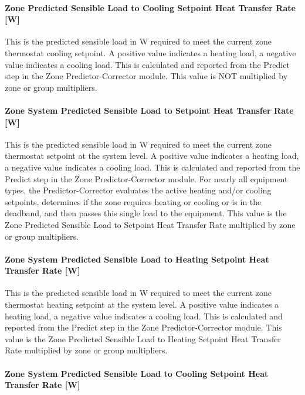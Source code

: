 \paragraph{Zone Predicted Sensible Load to Cooling Setpoint Heat Transfer Rate {[}W{]}}

This is the predicted sensible load in W required to meet the current zone thermostat cooling setpoint. A positive value indicates a heating load, a negative value indicates a cooling load. This is calculated and reported from the Predict step in the Zone Predictor-Corrector module. This value is NOT multiplied by zone or group multipliers.

\paragraph{Zone System Predicted Sensible Load to Setpoint Heat Transfer Rate {[}W{]}}\label{zone-predicted-sensible-load-to-setpoint-heat-transfer-rate-w}

This is the predicted sensible load in W required to meet the current zone thermostat setpoint at the system level. A positive value indicates a heating load, a negative value indicates a cooling load. This is calculated and reported from the Predict step in the Zone Predictor-Corrector module. For nearly all equipment types, the Predictor-Corrector evaluates the active heating and/or cooling setpoints, determines if the zone requires heating or cooling or is in the deadband, and then passes this single load to the equipment. This value is the Zone Predicted Sensible Load to Setpoint Heat Transfer Rate multiplied by zone or group multipliers.

\paragraph{Zone System Predicted Sensible Load to Heating Setpoint Heat Transfer Rate {[}W{]}}\label{zone-predicted-sensible-load-to-heating-setpoint-heat-transfer-rate-w}

This is the predicted sensible load in W required to meet the current zone thermostat heating setpoint at the system level. A positive value indicates a heating load, a negative value indicates a cooling load. This is calculated and reported from the Predict step in the Zone Predictor-Corrector module. This value is the Zone Predicted Sensible Load to Heating Setpoint Heat Transfer Rate multiplied by zone or group multipliers.

\paragraph{Zone System Predicted Sensible Load to Cooling Setpoint Heat Transfer Rate {[}W{]}}\label{zone-predicted-sensible-load-to-cooling-setpoint-heat-transfer-rate-w}

